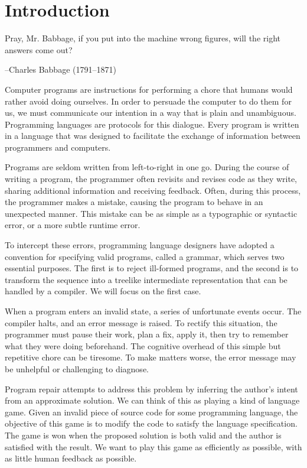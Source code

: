 \chapter*{\rm\bfseries Introduction}
\label{ch:introduction}

\epigraph{Pray, Mr. Babbage, if you put into the machine wrong figures, will the right answers come out?}{--Charles Babbage (1791--1871)}


Computer programs are instructions for performing a chore that humans would rather avoid doing ourselves. In order to persuade the computer to do them for us, we must communicate our intention in a way that is plain and unambiguous. Programming languages are protocols for this dialogue. Every program is written in a language that was designed to facilitate the exchange of information between programmers and computers.

Programs are seldom written from left-to-right in one go. During the course of writing a program, the programmer often revisits and revises code as they write, sharing additional information and receiving feedback. Often, during this process, the programmer makes a mistake, causing the program to behave in an unexpected manner. This mistake can be as simple as a typographic or syntactic error, or a more subtle runtime error.

To intercept these errors, programming language designers have adopted a convention for specifying valid programs, called a grammar, which serves two essential purposes. The first is to reject ill-formed programs, and the second is to transform the sequence into a treelike intermediate representation that can be handled by a compiler. We will focus on the first case.

When a program enters an invalid state, a series of unfortunate events occur. The compiler halts, and an error message is raised. To rectify this situation, the programmer must pause their work, plan a fix, apply it, then try to remember what they were doing beforehand. The cognitive overhead of this simple but repetitive chore can be tiresome. To make matters worse, the error message may be unhelpful or challenging to diagnose.

Program repair attempts to address this problem by inferring the author's intent from an approximate solution. We can think of this as playing a kind of language game. Given an invalid piece of source code for some programming language, the objective of this game is to modify the code to satisfy the language specification. The game is won when the proposed solution is both valid and the author is satisfied with the result. We want to play this game as efficiently as possible, with as little human feedback as possible.

